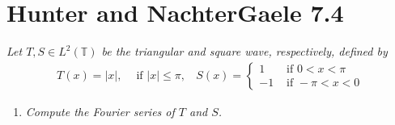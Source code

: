 \documentclass[12pt]{article}
\theoremstyle{plain}
\begin{document}
\section*{Hunter and NachterGaele 7.4}
\emph{Let $T, S \in L^2(\mathbb{T})$ be the triangular and square wave, respectively, defined by}
\begin{align*}
    T(x) = |x|,\ \ \ \ \text{ if } |x| \leq \pi,\ \ \ \ S(x) = \begin{cases}
        1 & \text{ if } 0 < x < \pi \\
        -1 & \text{ if } -\pi < x < 0
    \end{cases}
\end{align*}
\begin{enumerate}[\bf (a)]
    \item
        \emph{Compute the Fourier series of $T$ and $S$.} \\


\end{enumerate}
\end{document}

